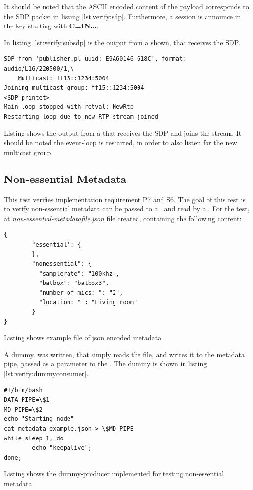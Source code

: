 It should be noted that the ASCII encoded content of the payload corresponds to the SDP packet in listing \ref{lst:verify:sdp}. Furthermore, a session is announce in the key starting with \textbf{C=IN...}.

In listing \ref{lst:verify:subsdp} is the output from a \sub{} shown, that receives the SDP.


\begin{listing}[H] 
\begin{verbatim}
SDP from 'publisher.pl uuid: E9A60146-618C', format: audio/L16/220500/1,\
	Multicast: ff15::1234:5004
Joining multicast group: ff15::1234:5004
<SDP printet>
Main-loop stopped with retval: NewRtp
Restarting loop due to new RTP stream joined
\end{verbatim}
\caption{Listing shows the output from a \sub{} that receives the SDP and joins the stream. It should be noted the event-loop is restarted, in order to also listen for the new multicast group}
\label{lst:verify:subsdp}
\end{listing}

\subsection{Non-essential Metadata} \label{sec:verify:nonessentialmetadata}
This test verifies implementation requirement P7 and S6. The goal of this test is to verify non-essential metadata can be passed to a \pro{}, and read by a \con{}. 
For the test, at \textit{non-essential-metadatafile.json} file created, containing the following content:

\begin{listing}[H] 
\begin{verbatim}
{
        "essential": {
        },
        "nonessential": {
          "samplerate": "100khz",
          "batbox": "batbox3",
          "number of mics: ": "2",
          "location: " : "Living room"
        }
}
\end{verbatim}
\caption{Listing shows example file of json encoded metadata}
\label{lst:verify:nonessentialmd}
\end{listing}

A dummy.\pro{} was written, that simply reads the file, and writes it to the metadata pipe, passed as a parameter to the \con{}. The dummy \pro{} is shown in listing \ref{lst:verify:dummyconsumer}.

\begin{listing}[H] 
\begin{verbatim}
#!/bin/bash
DATA_PIPE=\$1
MD_PIPE=\$2
echo "Starting node"
cat metadata_example.json > \$MD_PIPE
while sleep 1; do
        echo "keepalive";
done;  
\end{verbatim}
\caption{Listing shows the dummy-producer implemented for testing non-essential metadata}
\label{lst:verify:nonessentialmetadata}
\end{listing}

